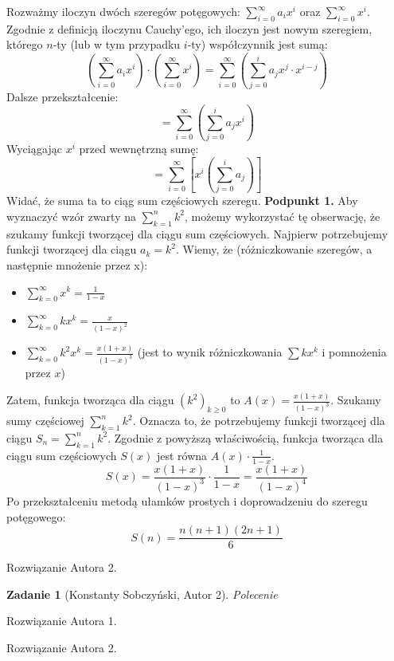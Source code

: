 \documentclass{mwart}
\newtheorem{zad}{Zadanie}[section]
\begin{document}
\begin{mdframed}
    Rozważmy iloczyn dwóch szeregów potęgowych: $\sum_{i=0}^{\infty} a_i x^i$ oraz $\sum_{i=0}^{\infty} x^i$.
    Zgodnie z definicją iloczynu Cauchy'ego, ich iloczyn jest nowym szeregiem, którego $n$-ty (lub w tym przypadku $i$-ty) współczynnik jest sumą:
    $$ \left( \sum_{i=0}^{\infty} a_i x^i \right) \cdot \left( \sum_{i=0}^{\infty} x^i \right) = \sum_{i=0}^{\infty} \left( \sum_{j=0}^{i} a_j x^j \cdot x^{i-j} \right) $$
    Dalsze przekształcenie:
    $$ = \sum_{i=0}^{\infty} \left( \sum_{j=0}^{i} a_j x^i \right) $$
    Wyciągając $x^i$ przed wewnętrzną sumę:
    $$ = \sum_{i=0}^{\infty} \left[ x^i \left( \sum_{j=0}^{i} a_j \right) \right] $$
    Widać, że suma ta to ciąg sum częściowych szeregu.
    \newline\textbf{Podpunkt 1.} \newline
    Aby wyznaczyć wzór zwarty na $\sum_{k=1}^n k^2$, możemy wykorzystać tę obserwację, że szukamy funkcji tworzącej dla ciągu sum częściowych.
    Najpierw potrzebujemy funkcji tworzącej dla ciągu $a_k = k^2$.
    Wiemy, że (różniczkowanie szeregów, a następnie mnożenie przez x):
    \begin{itemize}
        \item $\sum_{k=0}^{\infty} x^k = \frac{1}{1-x}$
        \item $\sum_{k=0}^{\infty} k x^k = \frac{x}{(1-x)^2}$
        \item $\sum_{k=0}^{\infty} k^2 x^k = \frac{x(1+x)}{(1-x)^3}$ (jest to wynik różniczkowania $\sum kx^k$ i pomnożenia przez $x$)
    \end{itemize}
    Zatem, funkcja tworząca dla ciągu $(k^2)_{k \ge 0}$ to $A(x) = \frac{x(1+x)}{(1-x)^3}$.
    Szukamy sumy częściowej $\sum_{k=1}^n k^2$. Oznacza to, że potrzebujemy funkcji tworzącej dla ciągu $S_n = \sum_{k=1}^n k^2$.
    Zgodnie z powyższą właściwością, funkcja tworząca dla ciągu sum częściowych $S(x)$ jest równa $A(x) \cdot \frac{1}{1-x}$.
    $$S(x) = \frac{x(1+x)}{(1-x)^3} \cdot \frac{1}{1-x} = \frac{x(1+x)}{(1-x)^4}$$
    Po przekształceniu metodą ułamków prostych i doprowadzeniu do szeregu potęgowego:
    $$S(n) = \frac{n(n+1)(2n+1)}{6}$$
\end{mdframed}
\begin{mdframed}
    Rozwiązanie Autora 2.
\end{mdframed}

\begin{zad}[Konstanty Sobczyński, Autor 2]
    Polecenie
\end{zad}
\begin{mdframed}
    Rozwiązanie Autora 1.
\end{mdframed}
\begin{mdframed}
    Rozwiązanie Autora 2.
\end{mdframed}
\end{document}
